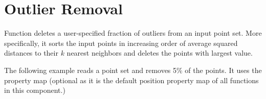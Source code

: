 \section{Outlier Removal}

Function  deletes a user-specified fraction of outliers from an input point set. More specifically, it sorts the input points in increasing order of average squared distances to their $k$ nearest neighbors and deletes the points with largest value. %




\ccExample

The following example reads a point set and removes 5\% of the points. It uses the  property map (optional as it is the default position property map of all functions in this component.)
